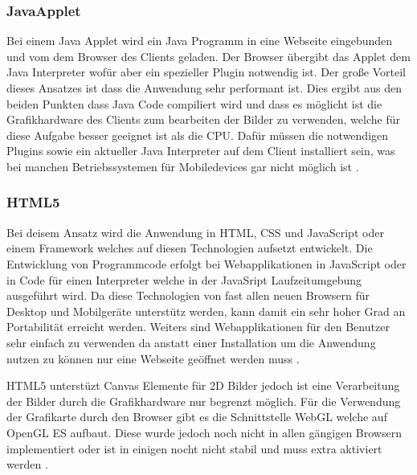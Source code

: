 \subsubsection{JavaApplet}
\label{sec:JavaApplet}
Bei einem Java Applet wird ein Java Programm in eine Webseite eingebunden und vom dem Browser des Clients geladen.
Der Browser übergibt das Applet dem Java Interpreter wofür aber ein spezieller Plugin notwendig ist.
%
Der große Vorteil dieses Ansatzes ist dass die Anwendung sehr performant ist.
Dies ergibt aus den beiden Punkten dass Java Code compiliert wird und dass es möglicht ist die Grafikhardware des Clients zum bearbeiten der Bilder zu verwenden,
welche für diese Aufgabe besser geeignet ist als die CPU.
%
Dafür müssen die notwendigen Plugins sowie ein aktueller Java Interpreter auf dem Client installiert sein, 
was bei manchen Betriebssystemen für Mobiledevices gar nicht möglich ist \cite{japp}.

\subsubsection{HTML5}
\label{sec:HTML5}
Bei deisem Ansatz wird die Anwendung in HTML, CSS und JavaScript oder einem Framework welches auf diesen Technologien aufsetzt entwickelt.
Die Entwicklung von Programmcode erfolgt bei Webapplikationen in JavaScript oder in Code für einen Interpreter welche in der JavaSript Laufzeitumgebung ausgeführt wird.
Da diese Technologien von fast allen neuen Browsern für Desktop und Mobilgeräte unterstütz werden, kann damit ein sehr hoher Grad an Portabilität erreicht werden.
Weiters sind Webapplikationen für den Benutzer sehr einfach zu verwenden da anstatt einer Installation um die Anwendung nutzen zu können nur eine Webseite geöffnet werden muss \cite{html-14}.

HTML5 unterstüzt Canvas Elemente für 2D Bilder jedoch ist eine Verarbeitung der Bilder durch die Grafikhardware nur begrenzt möglich.
Für die Verwendung der Grafikarte durch den Browser gibt es die Schnittstelle WebGL welche auf OpenGL ES aufbaut.
Diese wurde jedoch noch nicht in allen gängigen Browsern implementiert oder ist in einigen nocht nicht stabil und muss extra aktiviert werden \cite{webgl-14}.



